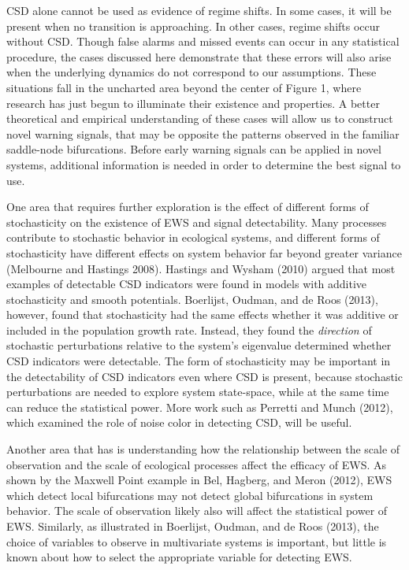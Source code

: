 \documentclass[author-year, review]{elsarticle} %
\begin{document}
CSD alone cannot be used as evidence of regime shifts. In some cases, it
will be present when no transition is approaching. In other cases,
regime shifts occur without CSD. Though false alarms and missed events
can occur in any statistical procedure, the cases discussed here
demonstrate that these errors will also arise when the underlying
dynamics do not correspond to our assumptions. These situations fall in
the uncharted area beyond the center of Figure 1, where research has
just begun to illuminate their existence and properties. A better
theoretical and empirical understanding of these cases will allow us to
construct novel warning signals, that may be opposite the patterns
observed in the familiar saddle-node bifurcations. Before early warning
signals can be applied in novel systems, additional information is
needed in order to determine the best signal to use.

One area that requires further exploration is the effect of different
forms of stochasticity on the existence of EWS and signal detectability.
Many processes contribute to stochastic behavior in ecological systems,
and different forms of stochasticity have different effects on system
behavior far beyond greater variance (Melbourne and Hastings 2008).
Hastings and Wysham (2010) argued that most examples of detectable CSD
indicators were found in models with additive stochasticity and smooth
potentials. Boerlijst, Oudman, and de Roos (2013), however, found that
stochasticity had the same effects whether it was additive or included
in the population growth rate. Instead, they found the \emph{direction}
of stochastic perturbations relative to the system's eigenvalue
determined whether CSD indicators were detectable. The form of
stochasticity may be important in the detectability of CSD indicators
even where CSD is present, because stochastic perturbations are needed
to explore system state-space, while at the same time can reduce the
statistical power. More work such as Perretti and Munch (2012), which
examined the role of noise color in detecting CSD, will be useful.

Another area that has is understanding how the relationship between the
scale of observation and the scale of ecological processes affect the
efficacy of EWS. As shown by the Maxwell Point example in Bel, Hagberg,
and Meron (2012), EWS which detect local bifurcations may not detect
global bifurcations in system behavior. The scale of observation likely
also will affect the statistical power of EWS. Similarly, as illustrated
in Boerlijst, Oudman, and de Roos (2013), the choice of variables to
observe in multivariate systems is important, but little is known about
how to select the appropriate variable for detecting EWS.
\end{document}
